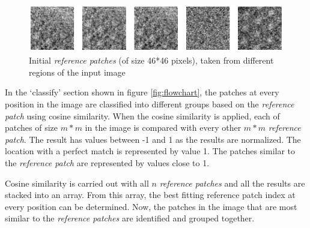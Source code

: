 \documentclass[fleqn,10pt]{wlscirep}
\begin{document}
\begin{figure}
	\centering
	\includegraphics[scale=0.75]{./imgs/initial_reference_patches.png}
	\caption[Initial \textit{reference patches}]{Initial \textit{reference patches} (of size 46*46 pixels), taken from different regions of the input image}
	\label{fig:initial_reference_patches}
\end{figure} 

In the `classify'  section shown in figure \ref{fig:flowchart}, the patches at every position in the image are classified into different groups based on the \textit{reference patch} using cosine similarity. When the cosine similarity is applied, each of patches of size $m*m$ in the image is compared with every other $m*m$ \textit{reference patch}. The result has values between -1 and 1 as the results are normalized. The location with a perfect match is represented by value 1. The patches similar to the \textit{reference patch} are represented by values close to 1. 

Cosine similarity is carried out with all $n$ \textit{reference patches} and all the results are stacked into an array. From this array, the best fitting reference patch index at every position can be determined. Now, the patches in the image that are most similar to the \textit{reference patches} are identified and grouped together.   


\end{document}
